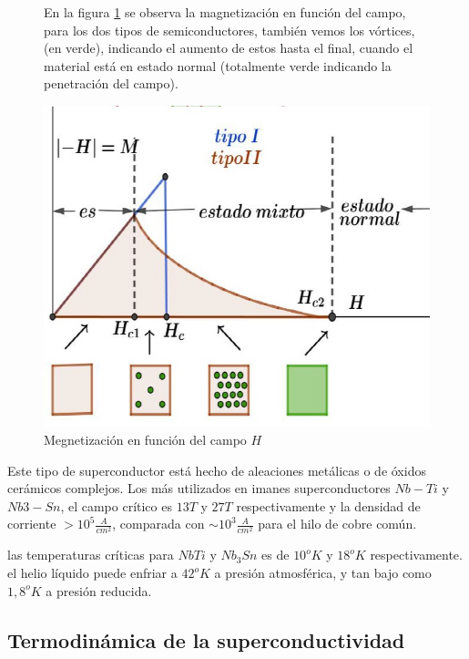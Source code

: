 \begin{figure}[H]
  \begin{minipage}[b]{0.47\textwidth}
  En la figura \ref{fig:423} se observa la magnetización en función del campo, para los dos tipos de semiconductores, también vemos los vórtices, (en verde), indicando el aumento de estos hasta el final, cuando el material está en estado normal (totalmente verde indicando la penetración del campo).
  \vspace{2cm}
  \end{minipage}
  \hfill
  \begin{minipage}[b]{0.47\textwidth}
     \includegraphics[width=1.10\textwidth]{./Figures/fig423}
     \caption{Megnetización en función del campo $H$ }
	\label{fig:423}
  \end{minipage}
\end{figure}

Este tipo de superconductor está hecho de aleaciones metálicas o de óxidos cerámicos complejos. Los más utilizados en imanes superconductores $Nb-Ti$ y $Nb3-Sn$, el campo crítico es $13 T$ y $27 T$ respectivamente y la densidad de corriente ${>10^{5}\frac{A}{cm^{2}}}$, comparada con ${\sim 10^{3}\frac{A}{cm^{2}}}$ para el hilo de cobre común.

las temperaturas críticas para $NbTi$ y $Nb_{3}Sn$ es de $10^{o}K$ y $18^{o}K$ respectivamente. el helio líquido puede enfriar a $42^{o}K$ a presión atmosférica, y tan bajo como $1,8^{o}K$ a presión reducida.

\subsection{Termodinámica de la superconductividad}

